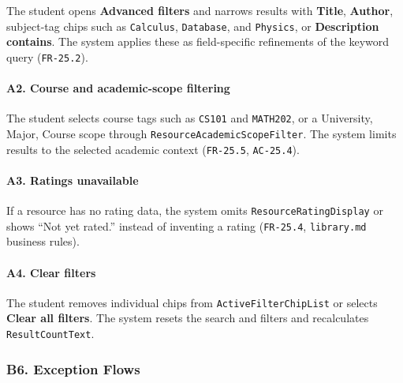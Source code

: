 \documentclass[12pt]{article}
\begin{document}
The student opens \textbf{Advanced filters} and narrows results with \textbf{Title}, \textbf{Author}, subject-tag chips such as \texttt{Calculus}, \texttt{Database}, and \texttt{Physics}, or \textbf{Description contains}. The system applies these as field-specific refinements of the keyword query (\texttt{FR-25.2}).
\par\medskip

\hypertarget{sec:a2-course-and-academic-scope-filtering}{}
\paragraph*{A2. Course and academic-scope filtering}
\par\medskip

The student selects course tags such as \texttt{CS101} and \texttt{MATH202}, or a University, Major, Course scope through \texttt{ResourceAcademicScopeFilter}. The system limits results to the selected academic context (\texttt{FR-25.5}, \texttt{AC-25.4}).
\par\medskip

\hypertarget{sec:a3-ratings-unavailable}{}
\paragraph*{A3. Ratings unavailable}
\par\medskip

If a resource has no rating data, the system omits \texttt{ResourceRatingDisplay} or shows “Not yet rated.” instead of inventing a rating (\texttt{FR-25.4}, \texttt{library.md} business rules).
\par\medskip

\hypertarget{sec:a4-clear-filters}{}
\paragraph*{A4. Clear filters}
\par\medskip

The student removes individual chips from \texttt{ActiveFilterChipList} or selects \textbf{Clear all filters}. The system resets the search and filters and recalculates \texttt{ResultCountText}.
\par\medskip

\hypertarget{sec:b6-exception-flows}{}
\subsubsection*{B6. Exception Flows}
\par\medskip
\end{document}
